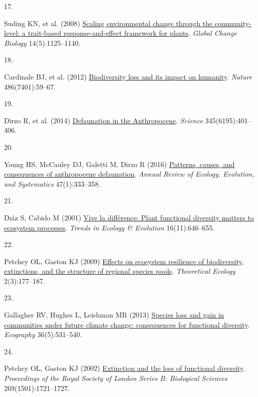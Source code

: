\documentclass{article}
\newlength{\cslhangindent}
\newlength{\csllabelwidth}
\newlength{\cslentryspacingunit} %
\newenvironment{CSLReferences}[2] %
 {%
  \setlength{\parindent}{0pt}
  \ifodd #1
  \let\oldpar\par
  \def\par{\hangindent=\cslhangindent\oldpar}
  \fi
  \setlength{\parskip}{#2\cslentryspacingunit}
 }%
 {}
\newcommand{\CSLLeftMargin}[1]{\parbox[t]{\csllabelwidth}{#1}}
\newcommand{\CSLRightInline}[1]{\parbox[t]{\linewidth - \csllabelwidth}{#1}\break}
\begin{document}
\begin{CSLReferences}{0}{0}
\leavevmode{}%
\CSLLeftMargin{17. }%
\CSLRightInline{Suding KN, et al. (2008)
\href{https://doi.org/10.1111/j.1365-2486.2008.01557.x}{Scaling
environmental change through the community-level: a trait-based
response-and-effect framework for plants}. \emph{Global Change Biology}
14(5):1125--1140.}

\leavevmode{}%
\CSLLeftMargin{18. }%
\CSLRightInline{Cardinale BJ, et al. (2012)
\href{https://doi.org/10.1038/nature11148}{Biodiversity loss and its
impact on humanity}. \emph{Nature} 486(7401):59--67.}

\leavevmode{}%
\CSLLeftMargin{19. }%
\CSLRightInline{Dirzo R, et al. (2014)
\href{https://doi.org/10.1126/science.1251817}{Defaunation in the
Anthropocene}. \emph{Science} 345(6195):401--406.}

\leavevmode{}%
\CSLLeftMargin{20. }%
\CSLRightInline{Young HS, McCauley DJ, Galetti M, Dirzo R (2016)
\href{https://doi.org/10.1146/annurev-ecolsys-112414-054142}{Patterns,
causes, and consequences of anthropocene defaunation}. \emph{Annual
Review of Ecology, Evolution, and Systematics} 47(1):333--358.}

\leavevmode{}%
\CSLLeftMargin{21. }%
\CSLRightInline{Dıáz S, Cabido M (2001)
\href{https://doi.org/10.1016/S0169-5347(01)02283-2}{Vive la différence:
Plant functional diversity matters to ecosystem processes}. \emph{Trends
in Ecology \& Evolution} 16(11):646--655.}

\leavevmode{}%
\CSLLeftMargin{22. }%
\CSLRightInline{Petchey OL, Gaston KJ (2009)
\href{https://doi.org/10.1007/s12080-009-0041-9}{Effects on ecosystem
resilience of biodiversity, extinctions, and the structure of regional
species pools}. \emph{Theoretical Ecology} 2(3):177--187.}

\leavevmode{}%
\CSLLeftMargin{23. }%
\CSLRightInline{Gallagher RV, Hughes L, Leishman MR (2013)
\href{https://doi.org/10.1111/j.1600-0587.2012.07514.x}{Species loss and
gain in communities under future climate change: consequences for
functional diversity}. \emph{Ecography} 36(5):531--540.}

\leavevmode{}%
\CSLLeftMargin{24. }%
\CSLRightInline{Petchey OL, Gaston KJ (2002)
\href{https://doi.org/10.1098/rspb.2002.2073}{Extinction and the loss of
functional diversity}. \emph{Proceedings of the Royal Society of London
Series B: Biological Sciences} 269(1501):1721--1727.}


\end{CSLReferences}
\end{document}
